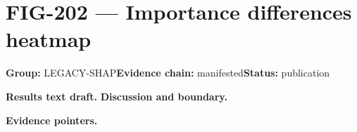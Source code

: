 \clearpage
\section{FIG-202 --- Importance differences heatmap}
\label{figpage:fig-202}
\textbf{Group:} LEGACY-SHAP\quad \textbf{Evidence chain:} manifested\quad \textbf{Status:} publication

\textbf{Results text draft.} 
\textbf{Discussion and boundary.} 


\textbf{Evidence pointers.}



\vfill
